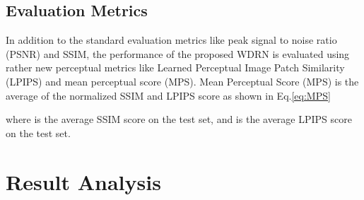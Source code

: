 \documentclass[runningheads]{llncs}
\begin{document}
\subsection{Evaluation Metrics}
In addition to the standard evaluation metrics like peak signal to noise ratio (PSNR) and SSIM, the performance of the proposed WDRN is evaluated using rather new perceptual metrics like Learned Perceptual Image Patch Similarity (LPIPS) \cite{zhang2018unreasonable} and mean perceptual score (MPS). Mean Perceptual Score (MPS) \cite{elhelou2020aim} is the average of the normalized SSIM \cite{wang2004image} and LPIPS score as shown in Eq.\ref{eq:MPS}

where  is the average SSIM score on the test set, and  is the average LPIPS score on the test set.


\section{Result Analysis}
\label{sec:result_analysis}
\end{document}
